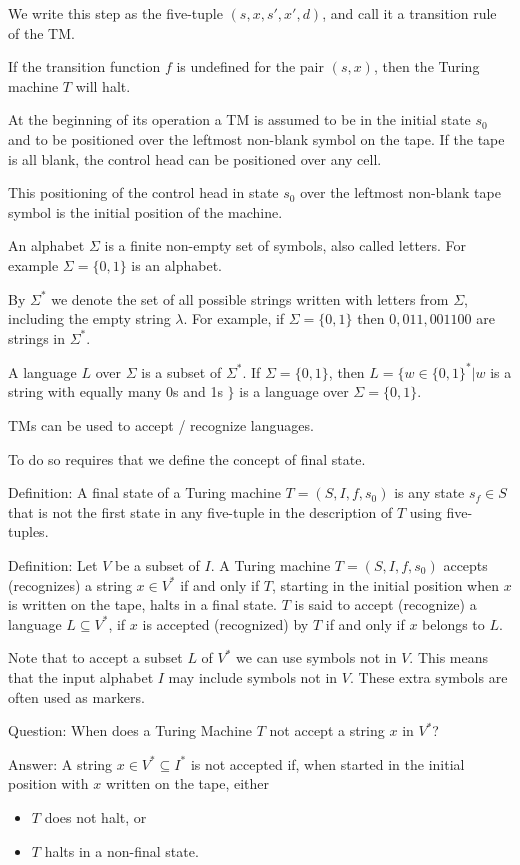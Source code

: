 \documentclass{article}
\begin{document}
We write this step as the five-tuple $(s,x,s',x',d)$, and call it a transition rule of the TM.

If the transition function $f$ is undefined for the pair $(s,x)$, then the Turing machine $T$ will halt.

At the beginning of its operation a TM is assumed to be in the initial state $s_0$ and to be positioned over the leftmost non-blank symbol on the tape. If the tape is all blank, the control head can be positioned over any cell.

This positioning of the control head in state $s_0$ over the leftmost non-blank tape symbol is the initial position of the machine.

An alphabet $\Sigma$ is a finite non-empty set of symbols, also called letters. For example $\Sigma = \{0,1\}$ is an alphabet.

By $\Sigma^*$ we denote the set of all possible strings written with letters from $\Sigma$, including the empty string $\lambda$. For example, if $\Sigma = \{0,1\}$ then $0,011,001100$ are strings in $\Sigma^*$.

A language $L$ over $\Sigma$ is a subset of $\Sigma^*$. If $\Sigma = \{0,1\}$, then $L = \{w \in \{0,1\}^* | w$ is a string with equally many 0s and 1s $\}$ is a language over $\Sigma = \{0,1\}$.

TMs can be used to accept / recognize languages.

To do so requires that we define the concept of final state.

Definition: A final state of a Turing machine $T = (S, I, f, s_0)$ is any state $s_f \in S$ that is not the first state in any five-tuple in the description of $T$ using five-tuples.

Definition: Let $V$ be a subset of $I$. A Turing machine $T = (S, I, f, s_0)$ accepts (recognizes) a string $x \in V^*$ if and only if $T$, starting in the initial position when $x$ is written on the tape, halts in a final state. $T$ is said to accept (recognize) a language $L \subseteq V^*$, if $x$ is accepted (recognized) by $T$ if and only if $x$ belongs to $L$. 

Note that to accept a subset $L$ of $V^*$ we can use symbols not in $V$. This means that the input alphabet $I$ may include symbols not in $V$. These extra symbols are often used as markers. 

Question: When does a Turing Machine $T$ not accept a string $x$ in $V^*$? 

Answer: A string $x \in V^* \subseteq I^*$ is not accepted if, when started in the initial position with $x$ written on the tape, either 
\begin{itemize}
    \item $T$ does not halt, or
    \item $T$ halts in a non-final state.
\end{itemize}
\end{document}
